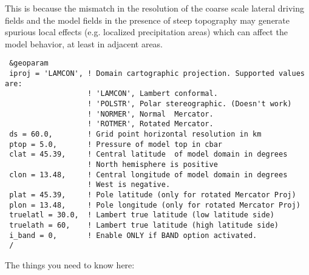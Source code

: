 This is because the mismatch in the resolution of the coarse scale lateral
driving fields and the model fields in the presence of steep topography may
generate spurious local effects (e.g. localized precipitation areas) which can
affect the model behavior, at least in adjacent areas. 

{\footnotesize
\begin{Verbatim}
 &geoparam
 iproj = 'LAMCON', ! Domain cartographic projection. Supported values are:
                   ! 'LAMCON', Lambert conformal.
                   ! 'POLSTR', Polar stereographic. (Doesn't work)
                   ! 'NORMER', Normal  Mercator.
                   ! 'ROTMER', Rotated Mercator.
 ds = 60.0,        ! Grid point horizontal resolution in km
 ptop = 5.0,       ! Pressure of model top in cbar
 clat = 45.39,     ! Central latitude  of model domain in degrees
                   ! North hemisphere is positive
 clon = 13.48,     ! Central longitude of model domain in degrees
                   ! West is negative.
 plat = 45.39,     ! Pole latitude (only for rotated Mercator Proj)
 plon = 13.48,     ! Pole longitude (only for rotated Mercator Proj)
 truelatl = 30.0,  ! Lambert true latitude (low latitude side)
 truelath = 60,    ! Lambert true latitude (high latitude side)
 i_band = 0,       ! Enable ONLY if BAND option activated.
 /
\end{Verbatim}
}

The things you need to know here:

